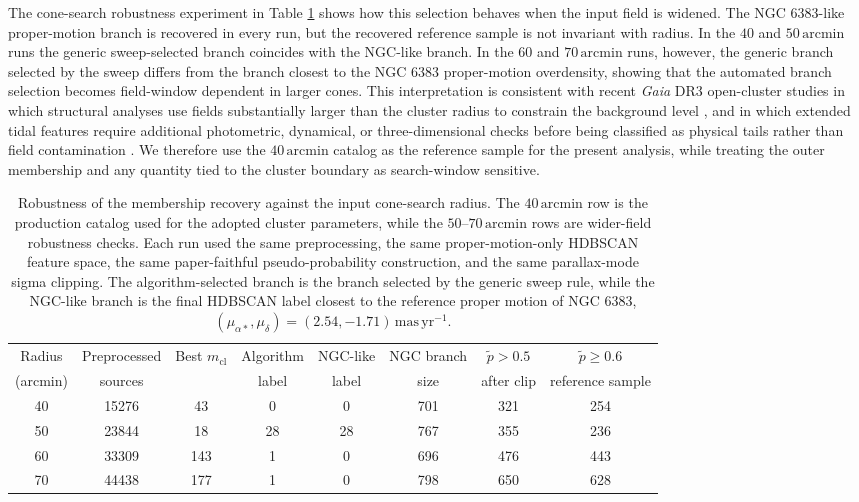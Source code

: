 \documentclass{aa}
\begin{document}
The cone-search robustness experiment in Table \ref{tab:cone_robustness} shows how this selection behaves when the input field is widened. The NGC 6383-like proper-motion branch is recovered in every run, but the recovered reference sample is not invariant with radius. In the $40$ and $50\,\mathrm{arcmin}$ runs the generic sweep-selected branch coincides with the NGC-like branch. In the $60$ and $70\,\mathrm{arcmin}$ runs, however, the generic branch selected by the sweep differs from the branch closest to the NGC 6383 proper-motion overdensity, showing that the automated branch selection becomes field-window dependent in larger cones. This interpretation is consistent with recent \textit{Gaia} DR3 open-cluster studies in which structural analyses use fields substantially larger than the cluster radius to constrain the background level \citep{2025MNRAS.539.2513A}, and in which extended tidal features require additional photometric, dynamical, or three-dimensional checks before being classified as physical tails rather than field contamination \citep{2025A&A...694A.258R,2025A&A...698A.156X}. We therefore use the $40\,\mathrm{arcmin}$ catalog as the reference sample for the present analysis, while treating the outer membership and any quantity tied to the cluster boundary as search-window sensitive.

\begin{table}
		\caption{Robustness of the membership recovery against the input cone-search radius. The $40\,\mathrm{arcmin}$ row is the production catalog used for the adopted cluster parameters, while the $50$--$70\,\mathrm{arcmin}$ rows are wider-field robustness checks. Each run used the same preprocessing, the same proper-motion-only HDBSCAN feature space, the same paper-faithful pseudo-probability construction, and the same parallax-mode sigma clipping. The algorithm-selected branch is the branch selected by the generic sweep rule, while the NGC-like branch is the final HDBSCAN label closest to the reference proper motion of NGC 6383, $(\mu_{\alpha*},\mu_{\delta})=(2.54,-1.71)\,\mathrm{mas\,yr^{-1}}$.}
	\centering
	\begin{tabular}{cccccccc}
		\hline
		Radius & Preprocessed & Best $m_\mathrm{cl}$ & Algorithm & NGC-like & NGC branch & $\tilde{p}>0.5$ & $\tilde{p}\geq0.6$ \\
		(arcmin) & sources &  & label & label & size & after clip & reference sample \\
		\hline
		40 & 15276 & 43  & 0  & 0  & 701 & 321 & 254 \\
		50 & 23844 & 18  & 28 & 28 & 767 & 355 & 236 \\
		60 & 33309 & 143 & 1  & 0  & 696 & 476 & 443 \\
		70 & 44438 & 177 & 1  & 0  & 798 & 650 & 628 \\
		\hline
	\end{tabular}
	\label{tab:cone_robustness}
\end{table}
\end{document}
